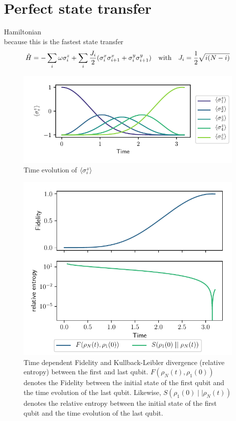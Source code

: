 \documentclass{book}
\numberwithin{equation}{section} %
\begin{document}
\section{Perfect state transfer}\label{sec:perfect-state-transfer}
Hamiltonian \cite{BA_Christandl_2004}\\
because this is the fastest state transfer \cite{Ba_QUANTUM-SPEED-LIM}
\begin{align}\label{eq:hamiltonian-perfect-transfer}
    \hat{H} = -\sum\limits_i \omega\sigma^z_i + \sum\limits_i \frac{J_i}{2} (\sigma^x_i\sigma^x_{i+1}+\sigma^y_i\sigma^y_{i+1})\qq{with}
    J_i = \frac{1}{2}\sqrt{i(N-i)}
\end{align}
\begin{figure}[h!]
    \centering
    \includegraphics{alltheplots/j_var/expval_z.pdf}
    \caption{Time evolution of $\expval{\sigma^z_i}$}
    \label{fig:perf_expval_z}
\end{figure}
\begin{figure}[h!]
    \centering
    \includegraphics{alltheplots/j_var/fidelity_kld_fixed_legend.pdf}
    \caption{Time dependent Fidelity and Kullback-Leibler divergence (relative entropy) between the first and last qubit.
    $F(\rho_N(t), \rho_1(0))$ denotes the Fidelity between the initial state of the first qubit and the time evolution of the last qubit.
    Likewise, $S(\rho_1(0)\mid\mid\rho_N(t))$ denotes the relative entropy between the initial state of the first qubit and the time evolution of the last qubit.}
    \label{fig:perf_fide_kld}
\end{figure}
\end{document}
